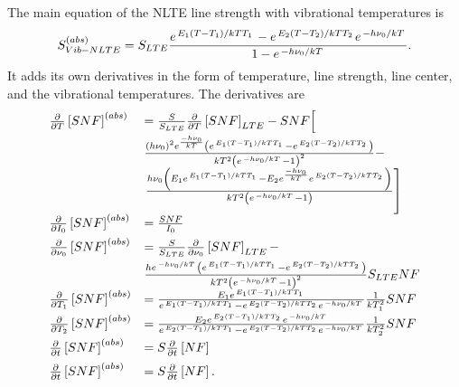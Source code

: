The main equation of the NLTE line strength with vibrational temperatures is
\begin{equation}
 S^{(abs)}_{Vib-NLTE} = S_{LTE} \frac{e^{\left.{E_1 (T - T_1)}\middle/{kTT_1}\right.} - e^{\left.{E_2 (T - T_2)}\middle/{kTT_2}\right.}e^{\left. -h\nu_0 \middle/ kT\right.}}{1 - e^{\left. -h\nu_0 \middle/ kT\right.}}.
\end{equation}
It adds its own derivatives in the form of temperature,
line strength, line center, and the vibrational temperatures. The derivatives are
\begin{equation}
 \begin{array}{ll}
  \frac{\partial}{\partial T} \left[SNF\right]^{(abs)} &= \frac{S}{S_{LTE}}\frac{\partial}{\partial T} \left[SNF\right]_{LTE} - SNF\Bigl[ \\[5pt]& \frac{(h\nu_0)^2 e^{\frac{ -h\nu_0 }{ kT }} \left(e^{\left.{E_1 (T - T_1)}\middle/{kTT_1}\right.}-e^{\left.{E_2 (T - T_2)}\middle/{kTT_2}\right.}\right)}{kT^2\left(e^{\left. -h\nu_0 \middle/ kT\right.} - 1\right)^2} - \\[5pt]
  & \left. \frac{h\nu_0\left(E_1e^{\left.{E_1 (T - T_1)}\middle/{kTT_1}\right.} - E_2e^{\frac{ -h\nu_0 }{ kT }}e^{\left.{E_2 (T - T_2)}\middle/{kTT_2}\right.}\right)}{kT^2\left(e^{\left. -h\nu_0 \middle/ kT\right.} - 1\right)}\right] \\[5pt]
  \frac{\partial}{\partial I_0} \left[SNF\right]^{(abs)} &= \frac{SNF}{I_0} \\[5pt]
  \frac{\partial}{\partial \nu_0} \left[SNF\right]^{(abs)} &= \frac{S}{S_{LTE}} \frac{\partial}{\partial \nu_0} \left[SNF\right]_{LTE} - \\[5pt]& 
  \frac{h e^{\left. -h\nu_0 \middle/ kT \right.} \left(e^{\left.{E_1 (T - T_1)}\middle/{kTT_1}\right.} - e^{\left.{E_2 (T - T_2)}\middle/{kTT_2}\right.}\right)}{kT^2\left(e^{\left. -h\nu_0 \middle/ kT \right.} - 1\right)^2}S_{LTE}NF \\[5pt]
  \frac{\partial}{\partial T_1} \left[SNF\right]^{(abs)} &= \frac{E_1e^{\left.{E_1 (T - T_1)}\middle/{kTT_1}\right.}}{e^{\left.{E_1 (T - T_1)}\middle/{kTT_1}\right.} - e^{\left.{E_2 (T - T_2)}\middle/{kTT_2}\right.}e^{\left. -h\nu_0 \middle/ kT\right.}}\frac{1}{kT_1^2}SNF \\[5pt]
  \frac{\partial}{\partial T_2} \left[SNF\right]^{(abs)} &= \frac{E_2e^{\left.{E_2 (T - T_1)}\middle/{kTT_2}\right.}e^{\left. -h\nu_0 \middle/ kT\right.}}{e^{\left.{E_2 (T - T_1)}\middle/{kTT_1}\right.} - e^{\left.{E_2 (T - T_2)}\middle/{kTT_2}\right.}e^{\left. -h\nu_0 \middle/ kT\right.}}\frac{1}{kT_2^2}SNF \\[5pt]
  \frac{\partial}{\partial t} \left[SNF\right]^{(abs)} &= S \frac{\partial}{\partial t} \left[NF\right] \\[5pt]
  \frac{\partial}{\partial t} \left[SNF\right]^{(abs)} &= S\frac{\partial}{\partial t} \left[NF\right].
 \end{array}
\end{equation}
